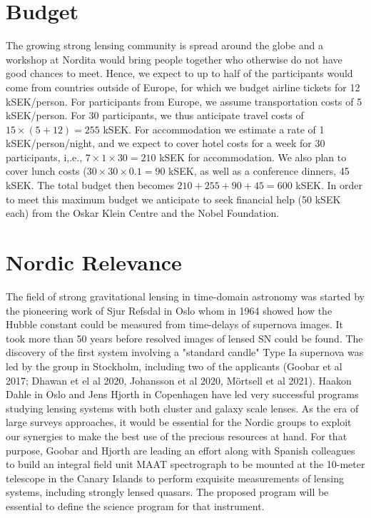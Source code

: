 \documentclass[11pt, letterpaper]{article}
\newcommand{\notesRemy}[1]{\textcolor{purple}{\bf \\  Remy: #1}}
\begin{document}
\section{Budget}
The growing strong lensing community is spread around the globe and a workshop at Nordita would bring people together who otherwise do not have good chances to meet. Hence, we expect to up to half of the participants would come from countries outside of Europe, for which we budget airline tickets for 12 kSEK/person. For participants from Europe, we assume transportation costs of 5 kSEK/person. For 30 participants, we thus anticipate travel costs of $ 15 \times (5 + 12) = 255$ kSEK.
For accommodation we estimate a rate of 1 kSEK/person/night, and we expect to cover hotel costs for a week for 30 participants, i,.e., $7 \times 1 \times 30 = 210$ kSEK for accommodation. We also plan to cover lunch costs ($30 \times 30 \times 0.1 = 90$ kSEK, as well as a conference dinners, 45 kSEK.
The total budget then becomes $210 + 255 + 90 + 45 = 600$ kSEK. In order to meet this maximum budget we anticipate to seek financial help (50 kSEK each) from the Oskar Klein Centre and the Nobel Foundation.

\section{Nordic Relevance}
The field of strong gravitational lensing in time-domain astronomy was started by 
the pioneering work of Sjur Refsdal in Oslo whom in 1964 showed how the Hubble constant could be measured from time-delays of supernova images. It took more than 50 years before resolved images of lensed SN could be found. The discovery of the first system involving a "standard candle" Type Ia supernova was led by the group in Stockholm, including two of the applicants (Goobar et al 2017; Dhawan et el al 2020, Johansson et al 2020, M\"ortsell et al 2021). Haakon Dahle in Oslo and Jens Hjorth in Copenhagen have led very successful programs studying lensing systems with both cluster and galaxy scale lenses. As the era of large surveys approaches, it would be essential for the Nordic groups to exploit our synergies to make the best use of the precious resources at hand. For that purpose, Goobar and Hjorth are leading an effort along with Spanish colleagues to build an integral field unit MAAT spectrograph to be mounted at the 10-meter telescope in the Canary Islands to perform exquisite measurements of lensing systems, including strongly lensed quasars. The proposed program will be essential to define the science program for that instrument.         
\end{document}
